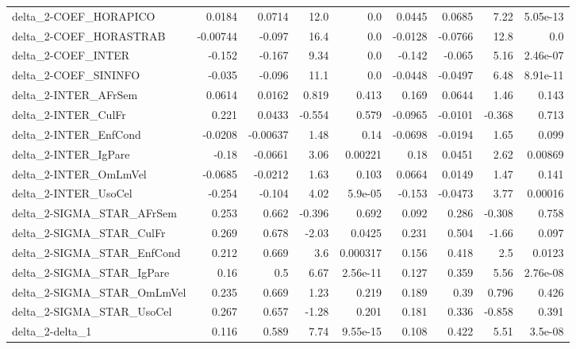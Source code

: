 \begin{tabular}{lrrrrrrrr}
delta\_2-COEF\_HORAPICO                 &      0.0184 &       0.0714 &    12.0 &      0.0 &     0.0445 &      0.0685 &         7.22 &      5.05e-13 \\
delta\_2-COEF\_HORASTRAB                &    -0.00744 &       -0.097 &    16.4 &      0.0 &    -0.0128 &     -0.0766 &         12.8 &           0.0 \\
delta\_2-COEF\_INTER                    &      -0.152 &       -0.167 &    9.34 &      0.0 &     -0.142 &      -0.065 &         5.16 &      2.46e-07 \\
delta\_2-COEF\_SININFO                  &      -0.035 &       -0.096 &    11.1 &      0.0 &    -0.0448 &     -0.0497 &         6.48 &      8.91e-11 \\
delta\_2-INTER\_AFrSem                  &      0.0614 &       0.0162 &   0.819 &    0.413 &      0.169 &      0.0644 &         1.46 &         0.143 \\
delta\_2-INTER\_CulFr                   &       0.221 &       0.0433 &  -0.554 &    0.579 &    -0.0965 &     -0.0101 &       -0.368 &         0.713 \\
delta\_2-INTER\_EnfCond                 &     -0.0208 &     -0.00637 &    1.48 &     0.14 &    -0.0698 &     -0.0194 &         1.65 &         0.099 \\
delta\_2-INTER\_IgPare                  &       -0.18 &      -0.0661 &    3.06 &  0.00221 &       0.18 &      0.0451 &         2.62 &       0.00869 \\
delta\_2-INTER\_OmLmVel                 &     -0.0685 &      -0.0212 &    1.63 &    0.103 &     0.0664 &      0.0149 &         1.47 &         0.141 \\
delta\_2-INTER\_UsoCel                  &      -0.254 &       -0.104 &    4.02 &  5.9e-05 &     -0.153 &     -0.0473 &         3.77 &       0.00016 \\
delta\_2-SIGMA\_STAR\_AFrSem             &       0.253 &        0.662 &  -0.396 &    0.692 &      0.092 &       0.286 &       -0.308 &         0.758 \\
delta\_2-SIGMA\_STAR\_CulFr              &       0.269 &        0.678 &   -2.03 &   0.0425 &      0.231 &       0.504 &        -1.66 &         0.097 \\
delta\_2-SIGMA\_STAR\_EnfCond            &       0.212 &        0.669 &     3.6 & 0.000317 &      0.156 &       0.418 &          2.5 &        0.0123 \\
delta\_2-SIGMA\_STAR\_IgPare             &        0.16 &          0.5 &    6.67 & 2.56e-11 &      0.127 &       0.359 &         5.56 &      2.76e-08 \\
delta\_2-SIGMA\_STAR\_OmLmVel            &       0.235 &        0.669 &    1.23 &    0.219 &      0.189 &        0.39 &        0.796 &         0.426 \\
delta\_2-SIGMA\_STAR\_UsoCel             &       0.267 &        0.657 &   -1.28 &    0.201 &      0.181 &       0.336 &       -0.858 &         0.391 \\
delta\_2-delta\_1                       &       0.116 &        0.589 &    7.74 & 9.55e-15 &      0.108 &       0.422 &         5.51 &       3.5e-08 \\
\bottomrule
\end{tabular}
